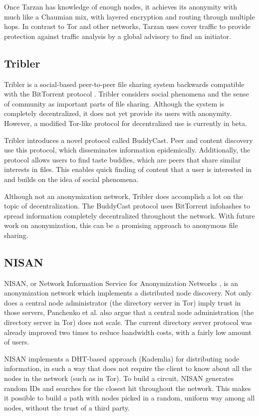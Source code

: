 \documentclass[12pt,journal,compsoc]{IEEEtran}
\begin{document}
		Once Tarzan has knowledge of enough nodes, it achieves its anonymity with much like a Chaumian mix, with layered encryption and routing through multiple hops. In contrast to Tor and other networks, Tarzan uses cover traffic to provide protection against traffic analysis by a global advisory to find an initiator.
		
	\subsection{Tribler} Tribler is a social-based peer-to-peer file sharing system backwards compatible with the BitTorrent protocol \cite{pouwelse2008tribler}. Tribler considers social phenomena and the sense of community as important parts of file sharing. Although the system is completely decentralized, it does not yet provide its users with anonymity. However, a modified Tor-like protocol for decentralized use is currently in beta.
		
		Tribler introduces a novel protocol called BuddyCast. Peer and content discovery use this protocol, which disseminates information epidemically. Additionally, the protocol allows users to find taste buddies, which are peers that share similar interests in files. This enables quick finding of content that a user is interested in and builds on the idea of social phenomena.


		Although not an anonymization network, Tribler does accomplish a lot on the topic of decentralization. The BuddyCast protocol uses BitTorrent infohashes to spread information completely decentralized throughout the network. With future work on anonymization, this can be a promising approach to anonymous file sharing.

	\subsection{NISAN} NISAN, or Network Information Service for Anonymization Networks \cite{panchenko2006nisan}, is an anonymization network which implements a distributed node discovery. Not only does a central node administrator (the directory server in Tor) imply trust in those servers, Panchenko et al. also argue that a central node administration (the directory server in Tor) does not scale. The current directory server protocol was already improved two times to reduce bandwidth costs, with a fairly low amount of users.
		
		NISAN implements a DHT-based approach (Kademlia) for distributing node information, in such a way that does not require the client to know about all the nodes in the network (such as in Tor). To build a circuit, NISAN generates random IDs and searches for the closest hit throughout the network. This makes it possible to build a path with nodes picked in a random, uniform way among all nodes, without the trust of a third party.
		
\end{document}
